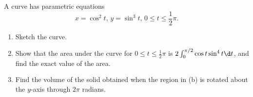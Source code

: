 \clearpage
\begin{problem}
    A curve has parametric equations \[x = \cos^2 t, \, y = \sin^3 t, \, 0 \leq t \leq \frac12 \pi.\]
    
    \begin{enumerate}
        \item Sketch the curve.
        \item Show that the area under the curve for $0 \leq t \leq \frac12 \pi$ is $2\int_0^{\pi/2} \cos t \sin^4 t \d t$, and find the exact value of the area.
        \item Find the volume of the solid obtained when the region in (b) is rotated about the $y$-axis through $2\pi$ radians.
    \end{enumerate}
\end{problem}
\begin{solution}
    \begin{ppart}
        \begin{center}
\end{center}
\end{ppart}
\end{solution}
